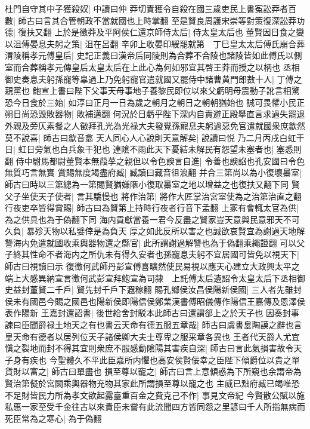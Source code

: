 杜門自守其中子獲殺奴|{
	中讀曰仲}
莽切責獲令自殺在國三歲吏民上書寃訟莽者百數|{
	師古曰言其合管朝政不當就國也上時掌翻}
至是賢良周護宋崇等對策復深訟莽功德|{
	復扶又翻}
上於是徵莽及平阿侯仁還京師侍太后|{
	侍太皇太后也}
董賢因日食之變以沮傅晏息夫躬之策|{
	沮在呂翻}
辛卯上收晏印綬罷就第　丁巳皇太太后傅氏崩合葬渭陵稱孝元傅皇后|{
	史記正義曰漢帝后同陵則為合葬不合陵也諸陵皆如此傅氏以側室而合葬稱孝元傳皇后太皇太后在上此心為何如邪宜其啓王莽而授之以柄也}
丞相御史奏息夫躬孫寵等辠過上乃免躬寵官遣就國又罷侍中諸曹黄門郎數十人|{
	丁傅之親黨也}
鮑宣上書曰陛下父事天母事地子養黎民即位以來父虧明母震動子訛言相驚恐今日食於三始|{
	如淳曰正月一日為歲之朝月之朝日之朝朝猶始也}
誠可畏懼小民正朔日尚恐毁敗器物|{
	敗補邁翻}
何況於日虧乎陛下深内自責避正殿舉直言求過失罷退外親及旁仄素餐之人徵拜孔光為光禄大夫發覺孫寵息夫躬過惡免官遣就國衆庶歙然莫不說喜|{
	師古曰歙音翕}
天人同心人心說則天意解矣|{
	說讀曰悦}
乃二月丙戌白虹干日|{
	虹日旁氣也白兵象干犯也}
連隂不雨此天下憂結未解民有怨望未塞者也|{
	塞悉則翻}
侍中駙馬都尉董賢本無葭莩之親但以令色諛言自進|{
	令善也諛諂也孔安國曰令色無質巧言無實}
賞賜無度竭盡府臧|{
	臧讀曰藏音徂浪翻}
并合三第尚以為小復壞㬥室|{
	師古曰時以三第總為一第賜賢猶嫌陿小復取㬥室之地以增益之也復扶又翻下同}
賢父子坐使天子使者|{
	言其驕慢也}
將作治第|{
	將作大匠掌治宮室使為之治第治直之翻}
行夜吏卒皆得賞賜|{
	師古曰為賢第上持時行夜者行音下孟翻}
上冢有會輒太官為供|{
	為之供具也為于偽翻下同}
海内貢獻當養一君今反盡之賢家豈天意與民意邪天不可久負|{
	暴殄天物以私嬖倖是為負天}
厚之如此反所以害之也誠欲哀賢宜為謝過天地解讐海内免遣就國收乘輿器物還之縣官|{
	此所謂謝過解讐也為于偽翻乘繩證翻}
可以父子終其性命不者海内之所仇未有得久安者也孫寵息夫躬不宜居國可皆免以視天下|{
	師古曰視讀曰示}
復徵何武師丹彭宣傅喜曠然使民易視以應天心建立大政興太平之端上大感異納宣言徵何武彭宣拜鮑宣為司隸　上託傅太后遺詔令太皇太后下丞相御史益封董賢二千戶|{
	賢先封千戶下遐稼翻}
賜孔鄉侯汝昌侯陽新侯國|{
	三人者先雖封侯未有國邑今賜之國邑也陽新侯即陽信侯鄭業漢書傅昭儀傳作陽信王嘉傳及恩澤侯表作陽新}
王嘉封還詔書|{
	後世給舍封駁本此師古曰還謂郤上之於天子也}
因奏封事諫曰臣聞爵禄土地天之有也書云天命有德五服五章哉|{
	師古曰虞書辠陶謨之辭也言皇天命有德者以居列位天子諸侯卿大夫士尊卑之服采章各異也}
王者代天爵人尤宜愼之裂地而封不得其宜則衆庶不服感動隂陽其害疾自深|{
	師古曰言此氣損害故令天子身有疾也}
今聖體久不平此臣嘉所内懼也高安侯賢佞幸之臣陛下傾爵位以貴之單貨財以富之|{
	師古曰單盡也}
損至尊以寵之|{
	師古曰言上意傾惑為下所窺也余謂帝為賢治第儗於宮闕乘輿器物充物其家此所謂損至尊以寵之也}
主威已黜府臧已竭唯恐不足財皆民力所為孝文欲起露臺重百金之費克己不作|{
	事見文帝紀}
今賢散公賦以施私惠一家至受千金往古以來貴臣未嘗有此流聞四方皆同怨之里諺曰千人所指無病而死臣常為之寒心|{
	為于偽翻}
